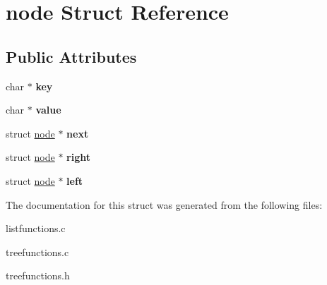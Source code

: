 \hypertarget{structnode}{}\section{node Struct Reference}
\label{structnode}
\subsection*{Public Attributes}
\begin{DoxyCompactItemize}
\item 
\hypertarget{structnode_ae69f3ca85aa87a221cd0ccd613726b97}{}char $\ast$ {\bfseries key}\label{structnode_ae69f3ca85aa87a221cd0ccd613726b97}

\item 
\hypertarget{structnode_a53e51625e3b93203e75251bb0b88419b}{}char $\ast$ {\bfseries value}\label{structnode_a53e51625e3b93203e75251bb0b88419b}

\item 
\hypertarget{structnode_aa3e8aa83f864292b5a01210f4453fcc0}{}struct \hyperlink{structnode}{node} $\ast$ {\bfseries next}\label{structnode_aa3e8aa83f864292b5a01210f4453fcc0}

\item 
\hypertarget{structnode_a51e160f22dc6064bac4a4f9f1d931c2c}{}struct \hyperlink{structnode}{node} $\ast$ {\bfseries right}\label{structnode_a51e160f22dc6064bac4a4f9f1d931c2c}

\item 
\hypertarget{structnode_af7109e6ffd82cbbb705e486fd0ce92f0}{}struct \hyperlink{structnode}{node} $\ast$ {\bfseries left}\label{structnode_af7109e6ffd82cbbb705e486fd0ce92f0}

\end{DoxyCompactItemize}


The documentation for this struct was generated from the following files\+:\begin{DoxyCompactItemize}
\item 
listfunctions.\+c\item 
treefunctions.\+c\item 
treefunctions.\+h\end{DoxyCompactItemize}
